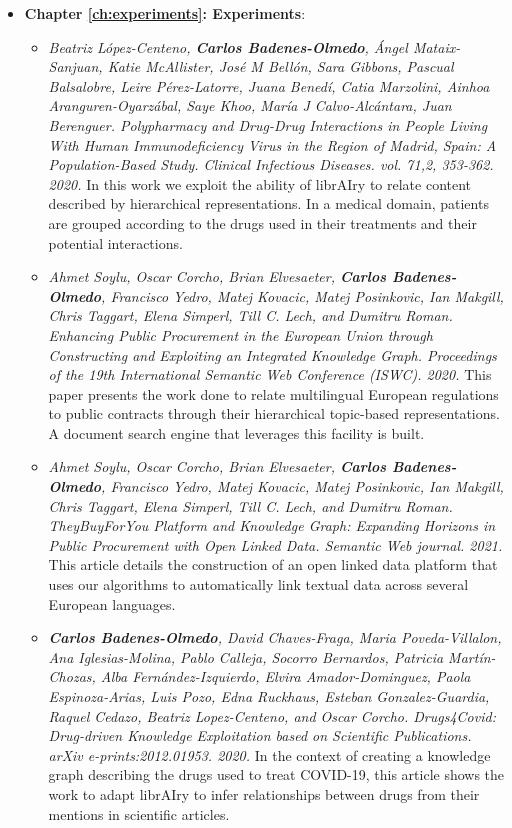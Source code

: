\begin{itemize}
\begin{itemize}
\end{itemize}
\item \textbf{Chapter \ref{ch:experiments}: Experiments}:
\begin{itemize}
\item \textit{Beatriz López-Centeno, \textbf{Carlos Badenes-Olmedo}, Ángel Mataix-Sanjuan, Katie McAllister, José M Bellón, Sara Gibbons, Pascual Balsalobre, Leire Pérez-Latorre, Juana Benedí, Catia Marzolini, Ainhoa Aranguren-Oyarzábal, Saye Khoo, María J Calvo-Alcántara, Juan Berenguer. \textit{Polypharmacy and Drug-Drug Interactions in People Living With Human Immunodeficiency Virus in the Region of Madrid, Spain: A Population-Based Study}. Clinical Infectious Diseases. vol. 71,2, 353-362. 2020.} In this work we exploit the ability of librAIry to relate content described by hierarchical representations. In a medical domain, patients are grouped according to the drugs used in their treatments and their potential interactions.
\item \textit{Ahmet Soylu, Oscar Corcho, Brian Elvesaeter, \textbf{Carlos Badenes-Olmedo}, Francisco Yedro, Matej Kovacic, Matej Posinkovic, Ian Makgill, Chris Taggart, Elena Simperl, Till C. Lech, and Dumitru Roman. \textit{Enhancing Public Procurement in the European Union through Constructing and Exploiting an Integrated Knowledge Graph}. Proceedings of the 19th International Semantic Web Conference (ISWC). 2020.} This paper presents the work done to relate multilingual European regulations to public contracts through their hierarchical topic-based representations. A document search engine that leverages this facility is built.  
\item \textit{Ahmet Soylu, Oscar Corcho, Brian Elvesaeter, \textbf{Carlos Badenes-Olmedo}, Francisco Yedro, Matej Kovacic, Matej Posinkovic, Ian Makgill, Chris Taggart, Elena Simperl, Till C. Lech, and Dumitru Roman. \textit{TheyBuyForYou Platform and Knowledge Graph: Expanding Horizons in Public Procurement with Open Linked Data}. Semantic Web journal. 2021.} This article details the construction of an open linked data platform that uses our algorithms to automatically link textual data across several European languages.  
\item \textit{\textbf{Carlos Badenes-Olmedo}, David Chaves-Fraga, Maria Poveda-Villalon, Ana Iglesias-Molina, Pablo Calleja, Socorro Bernardos, Patricia Martín-Chozas, Alba Fernández-Izquierdo, Elvira Amador-Dominguez, Paola Espinoza-Arias, Luis Pozo, Edna Ruckhaus, Esteban Gonzalez-Guardia, Raquel Cedazo, Beatriz Lopez-Centeno, and Oscar Corcho. \textit{Drugs4Covid: Drug-driven Knowledge Exploitation based on Scientific Publications}. arXiv e-prints:2012.01953. 2020.} In the context of creating a knowledge graph describing the drugs used to treat COVID-19, this article shows the work to adapt librAIry to infer relationships between drugs from their mentions in scientific articles. 
\end{itemize}
\end{itemize}



